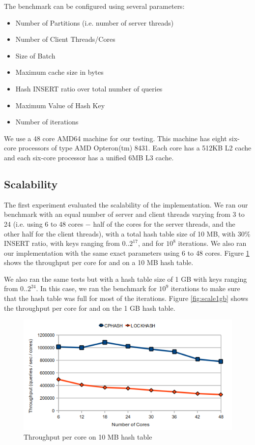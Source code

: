 The benchmark can be configured using several parameters:
\begin{itemize}
\item Number of Partitions (i.e. number of server threads)
\item Number of Client Threads/Cores
\item Size of Batch
\item Maximum cache size in bytes
\item Hash INSERT ratio over total number of queries
\item Maximum Value of Hash Key
\item Number of iterations
\end{itemize}

We use a 48 core AMD64 machine for our testing. This machine has eight six-core processors of type AMD Opteron(tm) 8431. Each core has
a 512KB L2 cache and each six-core processor has a unified 6MB L3 cache.

\subsection{Scalability}

The first experiment evaluated the scalability of the \cphash{} implementation. We ran our benchmark with an equal number of server 
and client threads varying from 3 to 24 (i.e. using 6 to 48 cores $-$ half of the cores for the server threads, and the other half for the 
client threads), with a total hash table size of 10 MB, with 30\% INSERT ratio, with keys ranging from 0..$2^{17}$, and for $10^{8}$ iterations. 
We also ran our \lockhash{} implementation with the same exact parameters using 6 to 48 cores. Figure \ref{fig:scale10mb} shows the 
throughput per core for \cphash{} and \lockhash{} on a 10 MB hash table.

We also ran the same tests but with a hash table size of 1 GB with keys ranging from 0..$2^{24}$. In this case, we ran the benchmark for $10^{9}$ iterations to make
sure that the hash table was full for most of the iterations. Figure \ref{fig:scale1gb} shows the throughput per core for \cphash{} and \lockhash{} on the
1 GB hash table.

\begin{figure}[!ht]
  \centering
  \includegraphics[width=0.8\linewidth]{figs/scale10mb.png}
  \caption{Throughput per core on 10 MB hash table}
  \label{fig:scale10mb}
\end{figure}
    
